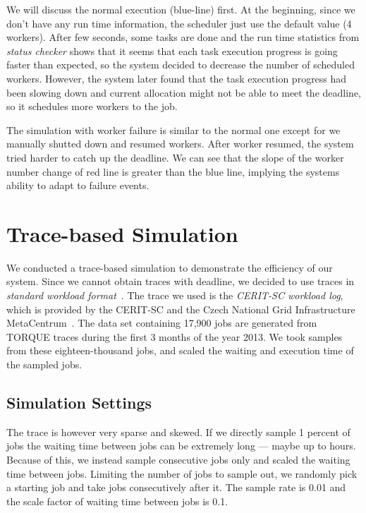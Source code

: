 We will discuss the normal execution (blue-line) first.
At the beginning, since we don't have any run time information, the
scheduler just use the default value (4 workers).
After few seconds, some tasks are done and the run time statistics from
\emph{status checker} shows that it seems that each task execution
progress is going faster than expected, so the system decided to
decrease the number of scheduled workers.
However, the system later found that the task execution progress had
been slowing down and current allocation might not be able to meet the
deadline, so it schedules more workers to the job.

The simulation with worker failure is similar to the normal one except
for we manually shutted down and resumed workers.
After worker resumed, the system tried harder to catch up the deadline.
We can see that the slope of the worker number change of red line is
greater than the blue line, implying the systems ability to adapt to
failure events.

\section{Trace-based Simulation}

We conducted a trace-based simulation to demonstrate the efficiency of
our system.
Since we cannot obtain traces with deadline, we decided to use traces in
{\em standard workload format}~\cite{cite:swf}.
The trace we used is the {\em CERIT-SC workload log}, which is provided
by the CERIT-SC and the Czech National Grid Infrastructure
MetaCentrum~\cite{cite:metacentrum}.
The data set containing 17,900 jobs are generated from TORQUE traces
during the first 3 months of the year 2013.
We took samples from these eighteen-thousand jobs, and scaled the
waiting and execution time of the sampled jobs.

\subsection{Simulation Settings}

The trace is however very sparse and skewed.
If we directly sample 1 percent of jobs the waiting time between jobs
can be extremely long --- maybe up to hours.
Because of this, we instead sample consecutive jobs only and scaled the
waiting time between jobs.
Limiting the number of jobs to sample out, we randomly pick a starting
job and take jobs consecutively after it. 
The sample rate is 0.01 and the scale factor of waiting time between
jobs is 0.1.

